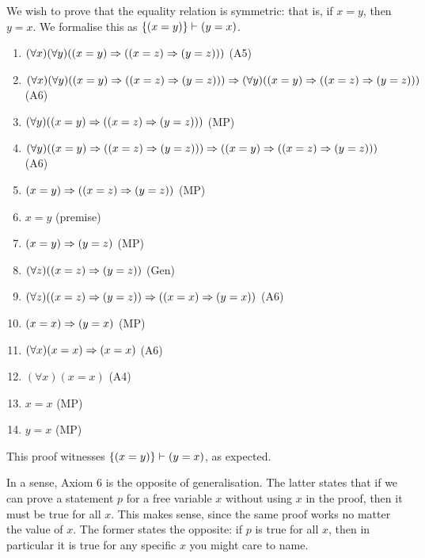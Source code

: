 \documentclass{article}
\begin{document}
\begin{example}
    We wish to prove that the equality relation is symmetric: that is, if $x = y$, then $y = x$. We formalise this as $\left\lbrace (x = y) \right\rbrace \vdash (y = x)$.
    \begin{enumerate}
	    \item $(\forall x)(\forall y)((x=y) \Rightarrow ((x=z) \Rightarrow (y=z)))$ \hfill (A5)
	    \item $(\forall x)(\forall y)((x=y) \Rightarrow ((x=z) \Rightarrow (y=z))) \Rightarrow (\forall y)((x=y) \Rightarrow ((x=z) \Rightarrow (y=z)))$ \hfill (A6)
	    \item $(\forall y)((x=y) \Rightarrow ((x=z) \Rightarrow (y=z)))$ \hfill (MP)
	    \item $(\forall y)((x=y) \Rightarrow ((x=z) \Rightarrow (y=z))) \Rightarrow ((x=y) \Rightarrow ((x=z) \Rightarrow (y=z)))$ \hfill (A6)
	    \item $(x=y) \Rightarrow ((x=z) \Rightarrow (y=z))$ \hfill (MP)
	    \item $x=y$ \hfill (premise)
	    \item $(x=y) \Rightarrow (y=z)$ \hfill (MP)
	    \item $(\forall z)((x=z) \Rightarrow (y=z))$ \hfill (Gen)
	    \item $(\forall z)((x=z) \Rightarrow (y=z)) \Rightarrow ((x=x) \Rightarrow (y=x))$ \hfill (A6)
	    \item $(x=x) \Rightarrow (y=x)$ \hfill (MP)
	    \item $(\forall x)(x = x) \Rightarrow (x = x)$ \hfill (A6)
	    \item $(\forall x)(x = x)$ \hfill (A4)
	    \item $x = x$ \hfill (MP)
	    \item $y = x$ \hfill (MP)
	\end{enumerate}
	This proof witnesses $\left\lbrace (x = y) \right\rbrace \vdash (y = x)$, as expected.
\end{example}

\begin{note}
	In a sense, Axiom 6 is the opposite of generalisation. The latter states that if we can prove a statement $p$ for a free variable $x$ without using $x$ in the proof, then it must be true for all $x$. This makes sense, since the same proof works no matter the value of $x$. The former states the opposite: if $p$ is true for all $x$, then in particular it is true for any specific $x$ you might care to name.
\end{note}
\end{document}
